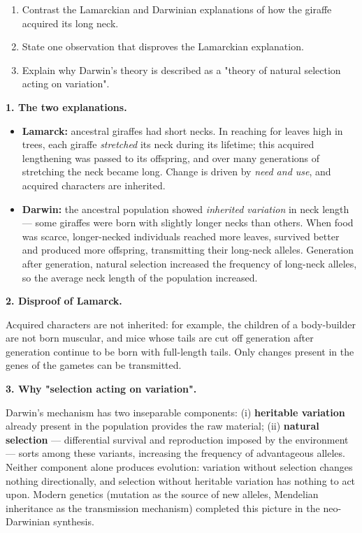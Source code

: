 \documentclass[11pt]{article}
\begin{document}
\begin{exoresolu}
\begin{enumerate}
\item Contrast the Lamarckian and Darwinian explanations of how the giraffe acquired its long neck.
\item State one observation that disproves the Lamarckian explanation.
\item Explain why Darwin's theory is described as a "theory of natural selection acting on variation".
\end{enumerate}
\tcblower
\textbf{1. The two explanations.}
\begin{itemize}
\item \textbf{Lamarck:} ancestral giraffes had short necks. In reaching for leaves high in trees, each giraffe \emph{stretched} its neck during its lifetime; this acquired lengthening was passed to its offspring, and over many generations of stretching the neck became long. Change is driven by \emph{need and use}, and acquired characters are inherited.
\item \textbf{Darwin:} the ancestral population showed \emph{inherited variation} in neck length — some giraffes were born with slightly longer necks than others. When food was scarce, longer-necked individuals reached more leaves, survived better and produced more offspring, transmitting their long-neck alleles. Generation after generation, natural selection increased the frequency of long-neck alleles, so the average neck length of the population increased.
\end{itemize}

\textbf{2. Disproof of Lamarck.}

Acquired characters are not inherited: for example, the children of a body-builder are not born muscular, and mice whose tails are cut off generation after generation continue to be born with full-length tails. Only changes present in the genes of the gametes can be transmitted.

\textbf{3. Why "selection acting on variation".}

Darwin's mechanism has two inseparable components: (i) \textbf{heritable variation} already present in the population provides the raw material; (ii) \textbf{natural selection} — differential survival and reproduction imposed by the environment — sorts among these variants, increasing the frequency of advantageous alleles. Neither component alone produces evolution: variation without selection changes nothing directionally, and selection without heritable variation has nothing to act upon. Modern genetics (mutation as the source of new alleles, Mendelian inheritance as the transmission mechanism) completed this picture in the neo-Darwinian synthesis.
\end{exoresolu}
\end{document}

